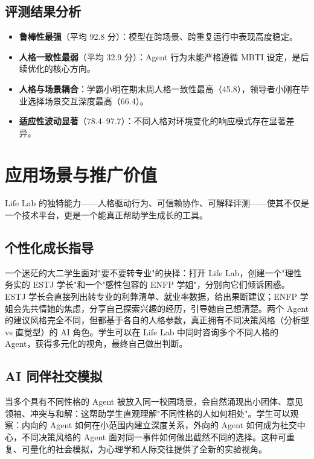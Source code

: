 \documentclass[12pt,a4paper]{article}%
\begin{document}
\subsection{评测结果分析}

\begin{itemize}
	\item \textbf{鲁棒性最强}（平均 92.8 分）：模型在跨场景、跨重复运行中表现高度稳定。
	\item \textbf{人格一致性最弱}（平均 32.9 分）：Agent 行为未能严格遵循 MBTI 设定，是后续优化的核心方向。
	\item \textbf{人格与场景耦合}：学霸小明在期末周人格一致性最高（45.8），领导者小刚在毕业选择场景交互深度最高（66.4）。
	\item \textbf{适应性波动显著}（78.4--97.7）：不同人格对环境变化的响应模式存在显著差异。
\end{itemize}

\section{应用场景与推广价值}

Life Lab 的独特能力——人格驱动行为、可信赖协作、可解释评测——使其不仅是一个技术平台，更是一个能真正帮助学生成长的工具。

\subsection{个性化成长指导}

一个迷茫的大二学生面对"要不要转专业"的抉择：打开 Life Lab，创建一个"理性务实的 ESTJ 学长"和一个"感性包容的 ENFP 学姐"，分别向它们倾诉困惑。ESTJ 学长会直接列出转专业的利弊清单、就业率数据，给出果断建议；ENFP 学姐会先共情她的焦虑，分享自己探索兴趣的经历，引导她自己想清楚。两个 Agent 的建议风格完全不同，但都基于各自的人格参数，真正拥有不同决策风格（分析型 vs 直觉型）的 AI 角色。学生可以在 Life Lab 中同时咨询多个不同人格的 Agent，获得多元化的视角，最终自己做出判断。

\subsection{AI 同伴社交模拟}

当多个具有不同性格的 Agent 被放入同一校园场景，会自然涌现出小团体、意见领袖、冲突与和解：这帮助学生直观理解"不同性格的人如何相处"。学生可以观察：内向的 Agent 如何在小范围内建立深度关系，外向的 Agent 如何成为社交中心，不同决策风格的 Agent 面对同一事件如何做出截然不同的选择。这种可重复、可量化的社会模拟，为心理学和人际交往提供了全新的实验视角。
\end{document}
